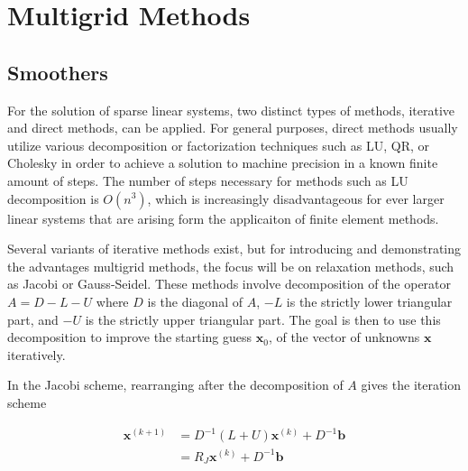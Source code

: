 
\chapter{Multigrid Methods}
\label{chapter:MultigridMethods}

\section{Smoothers}



For the solution of sparse linear systems, two distinct types of methods, iterative and direct methods, can be applied. For general purposes, direct methods usually utilize various decomposition or factorization techniques such as LU, QR, or Cholesky in order to achieve a solution to machine precision in a known finite amount of steps. The number of steps necessary for methods such as LU decomposition is $O(n^3)$, which is increasingly disadvantageous for ever larger linear systems that are arising form the applicaiton of finite element methods.

Several variants of iterative methods exist, but for introducing and demonstrating the advantages multigrid methods, the focus will be on relaxation methods, such as Jacobi or Gauss-Seidel. These methods involve decomposition of the operator $A = D - L - U$ where $D$ is the diagonal of $A$, $-L$ is the strictly lower triangular part, and $-U$ is the strictly upper triangular part. The goal is then to use this decomposition to improve the starting guess $\mathbf{x}_{0}$, of the vector of unknowns $\mathbf{x}$ iteratively.

In the Jacobi scheme, rearranging after the decomposition of $A$ gives the iteration scheme

\begin{equation}
	\begin{aligned}
	\mathbf{x}^{(k+1)} &= D^{-1}(L + U)\mathbf{x}^{(k)} + D^{-1}\mathbf{b} \\ 
	                   &= R_J\mathbf{x}^{(k)} + D^{-1} \mathbf{b}
	\end{aligned}
\end{equation}

